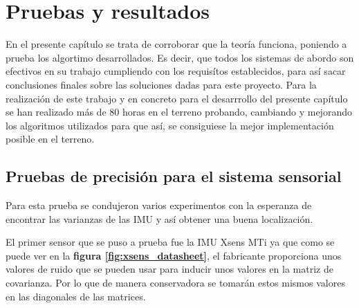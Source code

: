 \chapter{Pruebas y resultados}
En el presente capítulo se trata de corroborar que la teoría funciona, poniendo a prueba los algortimo desarrollados. Es decir, que todos los 
sistemas de abordo son efectivos en su trabajo cumpliendo con los requisítos establecidos, para así sacar conclusiones finales sobre las soluciones 
dadas para este proyecto. Para la realización de este trabajo y en concreto para el desarrrollo del presente capítulo se han realizado más de
80 horas en el terreno probando, cambiando y mejorando los algoritmos utilizados para que así, se consiguiese la mejor implementación posible en el terreno.

\section{Pruebas de precisión para el sistema sensorial}
Para esta prueba se condujeron varios experimentos con la esperanza de encontrar las varianzas de las IMU y así obtener una buena localización.

El primer sensor que se puso a prueba fue la IMU Xsens MTi ya que como se puede ver en la \textbf{figura \ref{fig:xsens_datasheet}}, el fabricante 
proporciona unos valores de ruido que se pueden usar para inducir unos valores en la matriz de covarianza. Por lo que de manera conservadora se tomarán 
estos mismos valores en las diagonales de las matrices.

